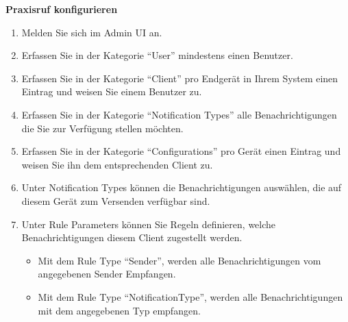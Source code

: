\textbf{Praxisruf konfigurieren}
\begin{enumerate}
    \item Melden Sie sich im Admin UI an.
    \item Erfassen Sie in der Kategorie ``User'' mindestens einen Benutzer.
    \item Erfassen Sie in der Kategorie ``Client'' pro Endgerät in Ihrem System einen Eintrag und weisen Sie einem Benutzer zu.
    \item Erfassen Sie in der Kategorie ``Notification Types'' alle Benachrichtigungen die Sie zur Verfügung stellen möchten.
    \item Erfassen Sie in der Kategorie ``Configurations'' pro Gerät einen Eintrag und weisen Sie ihn dem entsprechenden Client zu.
    \item Unter Notification Types können die Benachrichtigungen auswählen, die auf diesem Gerät zum Versenden verfügbar sind.
    \item Unter Rule Parameters können Sie Regeln definieren, welche Benachrichtigungen diesem Client zugestellt werden.

    \begin{itemize}
        \item Mit dem Rule Type ``Sender'', werden alle Benachrichtigungen vom angegebenen Sender Empfangen.
        \item Mit dem Rule Type ``NotificationType'', werden alle Benachrichtigungen mit dem angegebenen Typ empfangen.
    \end{itemize}
\end{enumerate}

\clearpage
